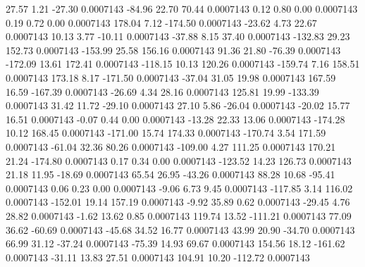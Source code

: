        27.57        1.21      -27.30     0.0007143
      -84.96       22.70       70.44     0.0007143
        0.12        0.80        0.00     0.0007143
        0.19        0.72        0.00     0.0007143
      178.04        7.12     -174.50     0.0007143
      -23.62        4.73       22.67     0.0007143
       10.13        3.77      -10.11     0.0007143
      -37.88        8.15       37.40     0.0007143
     -132.83       29.23      152.73     0.0007143
     -153.99       25.58      156.16     0.0007143
       91.36       21.80      -76.39     0.0007143
     -172.09       13.61      172.41     0.0007143
     -118.15       10.13      120.26     0.0007143
     -159.74        7.16      158.51     0.0007143
      173.18        8.17     -171.50     0.0007143
      -37.04       31.05       19.98     0.0007143
      167.59       16.59     -167.39     0.0007143
      -26.69        4.34       28.16     0.0007143
      125.81       19.99     -133.39     0.0007143
       31.42       11.72      -29.10     0.0007143
       27.10        5.86      -26.04     0.0007143
      -20.02       15.77       16.51     0.0007143
       -0.07        0.44        0.00     0.0007143
      -13.28       22.33       13.06     0.0007143
     -174.28       10.12      168.45     0.0007143
     -171.00       15.74      174.33     0.0007143
     -170.74        3.54      171.59     0.0007143
      -61.04       32.36       80.26     0.0007143
     -109.00        4.27      111.25     0.0007143
      170.21       21.24     -174.80     0.0007143
        0.17        0.34        0.00     0.0007143
     -123.52       14.23      126.73     0.0007143
       21.18       11.95      -18.69     0.0007143
       65.54       26.95      -43.26     0.0007143
       88.28       10.68      -95.41     0.0007143
        0.06        0.23        0.00     0.0007143
       -9.06        6.73        9.45     0.0007143
     -117.85        3.14      116.02     0.0007143
     -152.01       19.14      157.19     0.0007143
       -9.92       35.89        0.62     0.0007143
      -29.45        4.76       28.82     0.0007143
       -1.62       13.62        0.85     0.0007143
      119.74       13.52     -111.21     0.0007143
       77.09       36.62      -60.69     0.0007143
      -45.68       34.52       16.77     0.0007143
       43.99       20.90      -34.70     0.0007143
       66.99       31.12      -37.24     0.0007143
      -75.39       14.93       69.67     0.0007143
      154.56       18.12     -161.62     0.0007143
      -31.11       13.83       27.51     0.0007143
      104.91       10.20     -112.72     0.0007143

